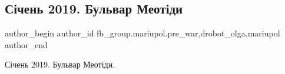  
 
 
 
 

\subsection{Січень 2019. Бульвар Меотіди}
\label{sec:11_02_2023.fb.fb_group.mariupol.pre_war.10.s_chen_2019__bulvar_}
 
\ifcmt
 author_begin
   author_id fb_group.mariupol.pre_war,drobot_olga.mariupol
 author_end
\fi

Січень 2019. Бульвар Меотіди.

